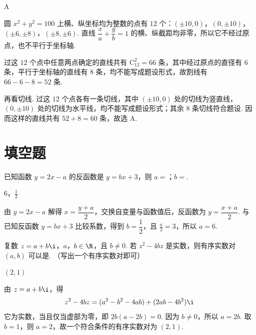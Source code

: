 \begin{answer}
A
\end{answer}

\begin{solution}
圆 \(x^2+y^2=100\) 上横、纵坐标均为整数的点有 \(12\) 个：\((\pm10,0)\)，\((0,\pm10)\)，\((\pm6,\pm8)\)，\((\pm8,\pm6)\). 直线 \(\dfrac{x}{a}+\dfrac{y}{b}=1\) 的横、纵截距均非零，所以它不经过原点，也不平行于坐标轴.

过这 \(12\) 个点中任意两点确定的直线共有 \(\mathrm C_{12}^{2}=66\) 条，其中经过原点的直径有 \(6\) 条，平行于坐标轴的直线有 \(8\) 条，均不能写成题设形式，故割线有 \(66-6-8=52\) 条.

再看切线. 过这 \(12\) 个点各有一条切线，其中 \((\pm10,0)\) 处的切线为竖直线，\((0,\pm10)\) 处的切线为水平线，均不能写成题设形式；其余 \(8\) 条切线符合题设. 因而这样的直线共有 \(52+8=60\) 条，故选 A.
\end{solution}

\section{填空题}

\begin{problem}
已知函数 \( y = 2x - a \) 的反函数是 \( y = bx + 3 \)，则 \(a=\)\fillinblank{}；\(b=\)\fillinblank{}.
\end{problem}

\begin{answer}
\(6\)，\(\frac{1}{2}\)
\end{answer}

\begin{solution}
由 \(y=2x-a\) 解得 \(x=\dfrac{y+a}{2}\)，交换自变量与函数值后，反函数为 \(y=\dfrac{x+a}{2}\). 与已知反函数 \(y=bx+3\) 比较系数，得到 \(b=\dfrac12\)，且 \(\frac{a}{2}=3\)，所以 \(a=6\).
\end{solution}

\begin{problem}
复数 \(z = a + b\i\)，\(a\)，\(b \in \R\)，且 \(b \neq 0\). 若 \(z^2 - 4bz\) 是实数，则有序实数对 \((a, b)\) 可以是\fillinblank{}. （写出一个有序实数对即可）
\end{problem}

\begin{answer}
\((2,1)\)
\end{answer}

\begin{solution}
由 \(z=a+b\i\)，得
\[
z^2-4bz=(a^2-b^2-4ab)+(2ab-4b^2)\i
\]
它为实数，当且仅当虚部为零，即 \(2b(a-2b)=0\). 因为 \(b\neq0\)，所以 \(a=2b\). 取 \(b=1\)，则 \(a=2\)，故一个符合条件的有序实数对为 \((2,1)\).
\end{solution}

